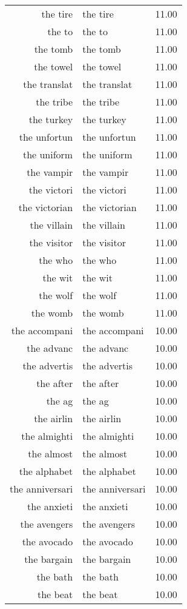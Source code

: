 \begin{table}[ht]
\begin{tabular}{rlr}
  the tire & the tire & 11.00 \\ 
  the to & the to & 11.00 \\ 
  the tomb & the tomb & 11.00 \\ 
  the towel & the towel & 11.00 \\ 
  the translat & the translat & 11.00 \\ 
  the tribe & the tribe & 11.00 \\ 
  the turkey & the turkey & 11.00 \\ 
  the unfortun & the unfortun & 11.00 \\ 
  the uniform & the uniform & 11.00 \\ 
  the vampir & the vampir & 11.00 \\ 
  the victori & the victori & 11.00 \\ 
  the victorian & the victorian & 11.00 \\ 
  the villain & the villain & 11.00 \\ 
  the visitor & the visitor & 11.00 \\ 
  the who & the who & 11.00 \\ 
  the wit & the wit & 11.00 \\ 
  the wolf & the wolf & 11.00 \\ 
  the womb & the womb & 11.00 \\ 
  the accompani & the accompani & 10.00 \\ 
  the advanc & the advanc & 10.00 \\ 
  the advertis & the advertis & 10.00 \\ 
  the after & the after & 10.00 \\ 
  the ag & the ag & 10.00 \\ 
  the airlin & the airlin & 10.00 \\ 
  the almighti & the almighti & 10.00 \\ 
  the almost & the almost & 10.00 \\ 
  the alphabet & the alphabet & 10.00 \\ 
  the anniversari & the anniversari & 10.00 \\ 
  the anxieti & the anxieti & 10.00 \\ 
  the avengers & the avengers & 10.00 \\ 
  the avocado & the avocado & 10.00 \\ 
  the bargain & the bargain & 10.00 \\ 
  the bath & the bath & 10.00 \\ 
  the beat & the beat & 10.00 \\ 

\end{tabular}
\end{table}
